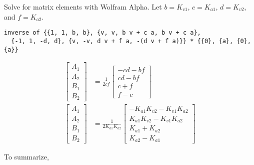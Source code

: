 Solve for matrix elements with Wolfram Alpha. Let
$b = K_{v1}$, $c = K_{a1}$, $d = K_{v2}$, and $f = K_{a2}$.

\begin{verbatim}
inverse of {{1, 1, b, b}, {v, v, b v + c a, b v + c a},
  {-1, 1, -d, d}, {v, -v, d v + f a, -(d v + f a)}} * {{0}, {a}, {0}, {a}}
\end{verbatim}

\begin{align*}
  \begin{bmatrix}
    A_1 \\
    A_2 \\
    B_1 \\
    B_2
  \end{bmatrix} &= \frac{1}{2cf}
  \begin{bmatrix}
    -cd - bf \\
    cd - bf \\
    c + f \\
    f - c
  \end{bmatrix} \\
  \begin{bmatrix}
    A_1 \\
    A_2 \\
    B_1 \\
    B_2
  \end{bmatrix} &= \frac{1}{2 K_{a1} K_{a2}}
  \begin{bmatrix}
    -K_{a1} K_{v2} - K_{v1} K_{a2} \\
    K_{a1} K_{v2} - K_{v1} K_{a2} \\
    K_{a1} + K_{a2} \\
    K_{a2} - K_{a1}
  \end{bmatrix}
\end{align*}

To summarize,

